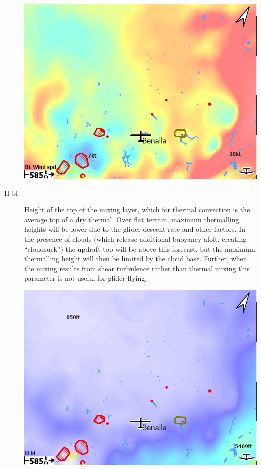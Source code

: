 \documentclass[a4paper,12pt]{refrep}
\begin{document}
\begin{description}
\begin{center}
\includegraphics[angle=0,width=\linewidth,keepaspectratio='true']{figures/rasp-blwindspd.png}
\end{center}

\item[H bl]  
Height of the top of the mixing layer, which for thermal convection is
the average top of a dry thermal.  Over flat terrain, maximum
thermalling heights will be lower due to the glider descent rate and
other factors.  In the presence of clouds (which release additional
buoyancy aloft, creating ``cloudsuck'') the updraft top will be above
this forecast, but the maximum thermalling height will then be limited
by the cloud base.  Further, when the mixing results from shear
turbulence rather than thermal mixing this parameter is not useful for
glider flying.

\begin{center}
\includegraphics[angle=0,width=\linewidth,keepaspectratio='true']{figures/rasp-hbl.png}
\end{center}


\end{description}
\end{document}
